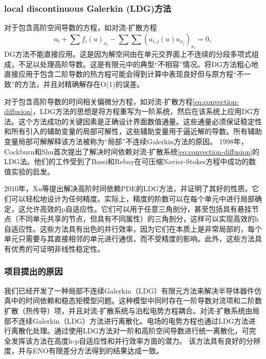 \subsubsection{local discontinuous Galerkin (LDG)方法}
对于包含高阶空间导数的方程，如对流-扩散方程
\begin{equation}\label{eq:convection-diffusion}
    u_t + \sum f_i(u)_{x_i} - \sum \sum (a_{i,j}(u)u_{x_j})_{x_i} = 0,
\end{equation}
DG方法不能直接应用。这是因为解空间由在单元交界面上不连续的分段多项式组成，不足以处理高阶导数。这是有限元中的典型“不相容”情况。将DG方法粗心地直接应用于包含二阶导数的热方程可能会得到计算中表现良好但与原方程“不一致”的方法，并且对精确解存在O(1)的误差\cite{cockburn2001runge,zhang2003analysis}。

对于包含高阶导数的时间相关偏微分方程，如对流-扩散方程\autoref{eq:convection-diffusion}，LDG方法的思想是将方程重写为一阶系统，然后在该系统上应用DG方法。这个方法成功的关键因素是正确设计界面数值通量。这些通量必须保证稳定性和所有引入的辅助变量的局部可解性，这些辅助变量用于逼近解的导数。所有辅助变量局部可解解释该方法被称为“局部”不连续Galerkin方法的原因\cite{cockburn1998local}。
1998年，Cockburn和Shu首次提出了解决时间依赖对流-扩散系统\autoref{eq:convection-diffusion}的LDG法\cite{cockburn1998local}。他们的工作受到了Bassi和Rebay在可压缩Navier-Stokes方程中成功的数值实验的启发\cite{bassi1997high}。

2010年，Xu等提出解决高阶时间依赖PDE的LDG方法\cite{xu2010local}，并证明了其好的性质。它们可以轻松地设计为任何精度。实际上，精度的阶数可以在每个单元中进行局部确定，这允许高效的p自适应性。它们可以用于任意三角剖分，甚至包括具有悬挂节点（不同单元共享的节点，但具有不同属性）的三角剖分，这样可以实现高效的h自适应性。这些方法具有出色的并行效率，因为它们在本质上是非常局部的，每个单元只需要与其直接相邻的单元进行通信，而不受精度的影响。此外，这些方法具有优秀的可证明非线性稳定性。

\subsubsection{项目提出的原因}
我们已经开发了一种局部不连续Galerkin（LDG）有限元方法来解决半导体器件仿真中的时间依赖和稳态矩模型问题\cite{liu2004local,liu2007locala}。这种模型中同时存在一阶导数对流项和二阶数扩散（热传导）项，并且对流-扩散系统与泊松电势方程耦合。对流-扩散系统由局部不连续Galerkin（LDG）方法进行离散化。电场的电势方程也通过LDG方法进行离散化处理。通过使用LDG方法对一阶和高阶空间导数进行统一离散化，可完全发挥该方法在高度h-p自适应性和并行效率方面的潜力。
该方法具有良好的分辨度\cite{liu2004local,liu2007locala}，并与ENO有限差分方法\cite{jerome1994energy}得到的结果达成一致。

